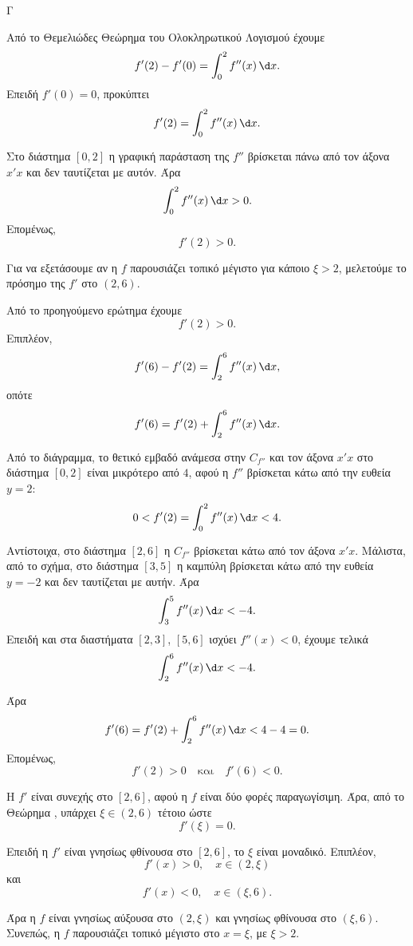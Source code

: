 \begin{thema}{Γ}
\begin{erwthma}
\item Από το Θεμελιώδες Θεώρημα του Ολοκληρωτικού Λογισμού έχουμε
\[
f'(2)-f'(0)=\int_0^2 f''(x)\,\d x.
\]
Επειδή $f'(0)=0$, προκύπτει
\[
f'(2)=\int_0^2 f''(x)\,\d x.
\]

Στο διάστημα $[0,2]$ η γραφική παράσταση της $f''$ βρίσκεται πάνω από τον άξονα $x'x$ και δεν ταυτίζεται με αυτόν. Άρα
\[
\int_0^2 f''(x)\,\d x>0.
\]
Επομένως,
\[
f'(2)>0.
\]

\item Για να εξετάσουμε αν η $f$ παρουσιάζει τοπικό μέγιστο για κάποιο $\xi>2$, μελετούμε το πρόσημο της $f'$ στο $(2,6)$.

Από το προηγούμενο ερώτημα έχουμε
\[
f'(2)>0.
\]
Επιπλέον,
\[
f'(6)-f'(2)=\int_2^6 f''(x)\,\d x,
\]
οπότε
\[
f'(6)=f'(2)+\int_2^6 f''(x)\,\d x.
\]

Από το διάγραμμα, το θετικό εμβαδό ανάμεσα στην $C_{f''}$ και τον άξονα $x'x$ στο διάστημα $[0,2]$ είναι μικρότερο από $4$, αφού η $f''$ βρίσκεται κάτω από την ευθεία $y=2$:
\[
0<f'(2)=\int_0^2 f''(x)\,\d x<4.
\]

Αντίστοιχα, στο διάστημα $[2,6]$ η $C_{f''}$ βρίσκεται κάτω από τον άξονα $x'x$. Μάλιστα, από το σχήμα, στο διάστημα $[3,5]$ η καμπύλη βρίσκεται κάτω από την ευθεία $y=-2$ και δεν ταυτίζεται με αυτήν. Άρα
\[
\int_3^5 f''(x)\,\d x<-4.
\]
Επειδή και στα διαστήματα $[2,3]$, $[5,6]$ ισχύει $f''(x)<0$, έχουμε τελικά
\[
\int_2^6 f''(x)\,\d x<-4.
\]

Άρα
\[
f'(6)=f'(2)+\int_2^6 f''(x)\,\d x<4-4=0.
\]
Επομένως,
\[
f'(2)>0
\quad\text{και}\quad
f'(6)<0.
\]

Η $f'$ είναι συνεχής στο $[2,6]$, αφού η $f$ είναι δύο φορές παραγωγίσιμη. Άρα, από το Θεώρημα , υπάρχει $\xi\in(2,6)$ τέτοιο ώστε
\[
f'(\xi)=0.
\]

Επειδή η $f'$ είναι γνησίως φθίνουσα στο $[2,6]$, το $\xi$ είναι μοναδικό. Επιπλέον,
\[
f'(x)>0,\quad x\in(2,\xi)
\]
και
\[
f'(x)<0,\quad x\in(\xi,6).
\]

Άρα η $f$ είναι γνησίως αύξουσα στο $(2,\xi)$ και γνησίως φθίνουσα στο $(\xi,6)$. Συνεπώς, η $f$ παρουσιάζει τοπικό μέγιστο στο $x=\xi$, με $\xi>2$.
\end{erwthma}
\end{thema}

